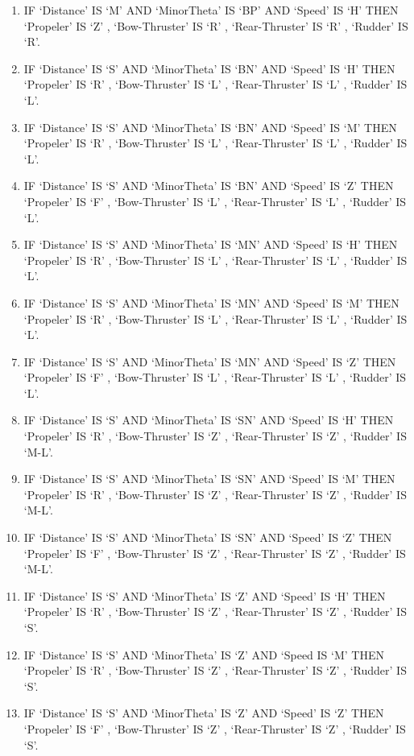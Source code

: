 \begin{enumerate}
\item	IF ‘Distance’ IS ‘M’  AND ‘MinorTheta’ IS ‘BP’  AND ‘Speed’ IS ‘H’ THEN ‘Propeler’ IS ‘Z’ , ‘Bow-Thruster’ IS ‘R’  , ‘Rear-Thruster’ IS  ‘R’  , ‘Rudder’ IS ‘R’. 
\item	IF ‘Distance’ IS ‘S’   AND ‘MinorTheta’ IS ‘BN’ AND ‘Speed’ IS ‘H’  THEN  ‘Propeler’ IS  ‘R’ ,  ‘Bow-Thruster’ IS ‘L’  ,  ‘Rear-Thruster’ IS  ‘L’  ,  ‘Rudder’ IS ‘L’. 
\item	IF ‘Distance’ IS ‘S’   AND ‘MinorTheta’ IS ‘BN’  AND ‘Speed’ IS ‘M’  THEN ‘Propeler’ IS ‘R’  , ‘Bow-Thruster’ IS ‘L’  ,  ‘Rear-Thruster’ IS  ‘L’  ,  ‘Rudder’ IS ‘L’. 
\item	IF ‘Distance’ IS ‘S’   AND ‘MinorTheta’ IS ‘BN’  AND ‘Speed’ IS ‘Z’  THEN ‘Propeler’ IS ‘F’ ,  ‘Bow-Thruster’ IS ‘L’  ,  ‘Rear-Thruster’ IS  ‘L’   , ‘Rudder’ IS ‘L’. 
\item	IF ‘Distance’ IS ‘S’   AND ‘MinorTheta’ IS ‘MN’  AND ‘Speed’ IS ‘H’  THEN ‘Propeler’ IS ‘R’  , ‘Bow-Thruster’ IS ‘L’  ,  ‘Rear-Thruster’ IS  ‘L’  ,  ‘Rudder’ IS ‘L’. 
\item	IF ‘Distance’ IS ‘S’   AND ‘MinorTheta’ IS ‘MN’  AND ‘Speed’ IS ‘M’  THEN ‘Propeler’ IS  ‘R’  , ‘Bow-Thruster’ IS ‘L’  ,  ‘Rear-Thruster’ IS  ‘L’  ,  ‘Rudder’ IS ‘L’. 
\item	IF ‘Distance’ IS ‘S’   AND ‘MinorTheta’ IS   ‘MN’  AND ‘Speed’ IS ‘Z’  THEN  ‘Propeler’ IS  ‘F’  , ‘Bow-Thruster’ IS ‘L’  ,  ‘Rear-Thruster’ IS  ‘L’ ,   ‘Rudder’ IS ‘L’. 
\item	IF ‘Distance’ IS ‘S’   AND ‘MinorTheta’ IS ‘SN’  AND ‘Speed’ IS ‘H’  THEN ‘Propeler’ IS ‘R’ ,  ‘Bow-Thruster’ IS ‘Z’   , ‘Rear-Thruster’ IS  ‘Z’  ,  ‘Rudder’ IS ‘M-L’. 
\item IF ‘Distance’ IS ‘S’   AND ‘MinorTheta’ IS ‘SN’  AND ‘Speed’ IS ‘M’  THEN ‘Propeler’ IS  ‘R’  ,  ‘Bow-Thruster’ IS ‘Z’  ,  ‘Rear-Thruster’ IS  ‘Z’  ,   ‘Rudder’ IS ‘M-L’. 
\item	IF ‘Distance’ IS ‘S’   AND ‘MinorTheta’ IS ‘SN’  AND ‘Speed’ IS ‘Z’  THEN ‘Propeler’ IS ‘F’  , ‘Bow-Thruster’ IS ‘Z’  ,  ‘Rear-Thruster’ IS  ‘Z’  ,  ‘Rudder’ IS ‘M-L’. 
\item	IF ‘Distance’ IS ‘S’   AND ‘MinorTheta’ IS ‘Z’  AND ‘Speed’ IS ‘H’  THEN ‘Propeler’ IS ‘R’ ,  ‘Bow-Thruster’ IS ‘Z’ ,   ‘Rear-Thruster’ IS  ‘Z’  ,  ‘Rudder’ IS ‘S’. 
\item	IF ‘Distance’ IS ‘S’   AND  ‘MinorTheta’ IS  ‘Z’  AND ‘Speed  IS ‘M’  THEN ‘Propeler’ IS  ‘R’  ,  ‘Bow-Thruster’ IS ‘Z’  ,  ‘Rear-Thruster’ IS  ‘Z’  ,  ‘Rudder’ IS ‘S’. 
\item	IF ‘Distance’ IS ‘S’   AND ‘MinorTheta’ IS ‘Z’  AND ‘Speed’  IS  ‘Z’   THEN  ‘Propeler’ IS ‘F’ ,  ‘Bow-Thruster’ IS ‘Z’  ,  ‘Rear-Thruster’ IS  ‘Z’  ,  ‘Rudder’ IS ‘S’. 

\end{enumerate}
